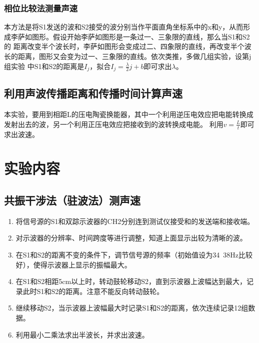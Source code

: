 \documentclass[UTF8]{ctexart}
\begin{document}
\subsubsection{相位比较法测量声速}
本方法是将S1发送的波和S2接受的波分别当作平面直角坐标系中的x和y，从而形成李萨如图形。假设开始李萨如图形是一条过一、三象限的直线，那么当S1和S2的
距离改变半个波长时，李萨如图形会变成过二、四象限的直线，再改变半个波长的距离，图形又会变为过一、三象限的直线。依次类推，多做几组实验，设第j组实验
中S1和S2的距离是$I_j$，拟合$I_j=\frac{\lambda}{2}j+b$即可求出$\lambda$。
\subsection{利用声波传播距离和传播时间计算声速}
本实验，要用到相距L的压电陶瓷换能器，其中一个利用逆压电效应把电能转换成发射出去的波，另一个利用正压电效应把接收到的波转换成电能。
利用$v=\frac{L}{t}$即可求出波速。
\section{实验内容}
\subsection{共振干涉法（驻波法）测声速}
\begin{enumerate}
    \item 将信号源的S1和双踪示波器的CH2分别连到测试仪接受和的发送端和接收端。
    \item 对示波器的分辨率、时间跨度等进行调整，知道上面显示出较为清晰的波。
    \item 在S1和S2的距离不变的条件下，调节信号源的频率（初始值设为34~38Hz比较好），使得示波器上显示的振幅最大。
    \item 在S1和S2相距5cm以上时，转动鼓轮移动S2，直到示波器上波幅达到最大，记录此时S1和S2的距离。注意不能反向转动鼓轮。
    \item 继续移动S2，当示波器上波幅最大时记录S1和S2的距离，依次连续记录12组数据。
    \item 利用最小二乘法求出半波长，并求出波速。
\end{enumerate}
\end{document}
